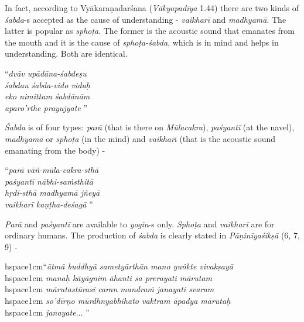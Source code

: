 In fact, according to Vyākaraṇadarśana (\textit{Vākyapadīya} 1.44) there are two kinds of \textit{śabda}-s accepted as the cause of understanding - \textit{vaikharī} and \textit{madhyamā}. The latter is popular as \textit{sphoṭa}. The former is the acoustic sound that emanates from the mouth and it is the cause of \textit{sphoṭa-śabda}, which is in mind and helps in understanding. Both are identical.

\begin{centerquote}
“\textit{dvāv upādāna-śabdeṣu}\\ \textit{śabdau śabda-vido viduḥ} \\ \textit{eko nimittam śabdānām}\\ \textit{aparo’rthe prayujyate} ”
\end{centerquote}

\textit{Śabda} is of four types: \textit{parā} (that is there on \textit{Mūlacakra}), \textit{paśyantī} (at the navel), \textit{madhyamā} or \textit{sphoṭa} (in the mind) and \textit{vaikhar}ī (that is the acoustic sound emanating from the body) -

\begin{centerquote}
“\textit{parā vāṅ-mūla-cakra-sthā}\\ \textit{paśyantī nābhi-saṁsthitā }\\ \textit{hṛdi-sthā madhyamā jñeyā}\\ \textit{vaikharī kaṇṭha-deśagā} ” 
\end{centerquote}

\textit{Parā} and \textit{paśyantī} are available to \textit{yogin}-s only. \textit{Sphoṭa} and \textit{vaikharī} are for ordinary humans. The production of \textit{śabda} is clearly stated in \textit{Pāṇinīyaśikṣā} (6, 7, 9) -

\begin{myquote}
hspace{1cm}“\textit{ātmā buddhyā sametyārthān mano yuṅkte vivakṣayā }\\hspace{1cm} \textit{manaḥ kāyāgnim āhanti sa prerayati mārutam }\\hspace{1cm} \textit{mārutastūrasi caran mandraṁ janayati svaram }\\hspace{1cm} \textit{so’dīrṇo mūrdhnyabhihato vaktram āpadya mārutaḥ }\\hspace{1cm} \textit{janayate}... ”
\end{myquote}

